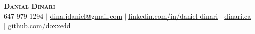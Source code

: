 \begin{center}
    \textbf{\Huge \scshape Danial Dinari} \\ \vspace{1pt}
    \small 647-979-1294 $|$ \href{mailto:dinaridaniel@gmail.com}{\underline{dinaridaniel@gmail.com}} $|$ 
    \href{https://www.linkedin.com/in/daniel-dinari/}{\underline{linkedin.com/in/daniel-dinari}} $|$
    \href{https://dinari.ca/}{\underline{dinari.ca}} $|$
    \href{https://github.com/doxxedd}{\underline{github.com/doxxedd}}
\end{center}